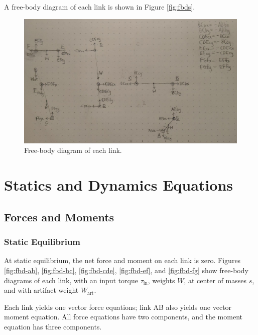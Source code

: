 \documentclass[12pt]{article}
\begin{document}
A free-body diagram of each link is shown in Figure \ref{fig:fbds}.

\begin{figure}[H]
  \centering
  \includegraphics[scale=0.3]{../fbds.jpeg}
  \caption{\label{fig:fbs}Free-body diagram of each link.}
\end{figure}

\section{Statics and Dynamics Equations}%
\label{eqns}

\subsection{Forces and Moments}%
\label{eqns.forces-moments}

\subsubsection{Static Equilibrium}%
\label{eqns.forces-moments.static}

At static equilibrium, the net force and moment on each link is zero. Figures \ref{fig:fbd-ab}, \ref{fig:fbd-bc}, \ref{fig:fbd-cde}, \ref{fig:fbd-ef}, and \ref{fig:fbd-fg} show free-body diagrams of each link, with an input torque $\tau_{\text{in}}$, weights $W$, at center of masses $s$, and with artifact weight $W_{\text{art}}$.

Each link yields one vector force equations; link AB also yields one vector moment equation. All force equations have two components, and the moment equation has three components.
\end{document}
